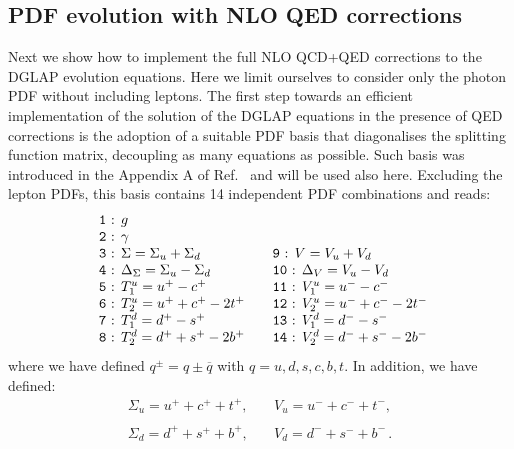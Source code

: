 \subsection{PDF evolution with NLO QED corrections}

Next we show how to implement the full NLO QCD+QED corrections to the
DGLAP evolution equations. Here we limit ourselves to consider only
the photon PDF without including leptons.
%
The first step towards an efficient implementation of the solution of
the DGLAP equations in the presence of QED corrections is the adoption
of a suitable PDF basis that diagonalises the splitting function
matrix, decoupling as many equations as possible.
%
Such basis was introduced in the Appendix A of
Ref.~\cite{Bertone:2015lqa} and will be used also here.
%
Excluding the lepton PDFs, this basis contains 14 independent PDF
combinations and reads:
\begin{equation}\label{eq:EvolBasis}
\begin{array}{ll}
\mbox{\texttt{ 1} : }g & \\
\mbox{\texttt{ 2} : }\gamma & \\
\mbox{\texttt{ 3} : }\displaystyle \Sigma = \Sigma_u + \Sigma_d & \quad
\mbox{\texttt{9} : }\displaystyle V =V_u +  V_d\\
\mbox{\texttt{ 4} : } \displaystyle \Delta_\Sigma = \Sigma_u - \Sigma_d& \quad\displaystyle 
\mbox{\texttt{10} : } \Delta_V = V_u - V_d\\
\mbox{\texttt{ 5} : }T_1^u = u^+ - c^+ &\quad \mbox{\texttt{11} : }V_1^u = u^- - c^- \\
\mbox{\texttt{ 6} : }T_2^u = u^+ + c^+ - 2t^+ &\quad \mbox{\texttt{12} : }V_2^u = u^- + c^- - 2t^-\\
\mbox{\texttt{ 7} : }T_1^d = d^+ - s^+ &\quad \mbox{\texttt{13} : }V_1^d = d^- - s^- \\
\mbox{\texttt{ 8} : }T_2^d = d^+ + s^+ - 2b^+ &\quad \mbox{\texttt{14}
                                               : }V_2^d = d^- + s^- -
                                               2b^-\\
\end{array}
\end{equation}
where we have defined $q^\pm = q\pm\overline{q}$ with
$q = u,d,s,c,b,t$. In addition, we have defined:
\begin{equation}
\begin{array}{ll}
\Sigma_u = u^++c^++t^+, &\quad V_u = u^-+c^-+t^-,\\
\\
\Sigma_d = d^++s^++b^+,&\quad V_d = d^-+s^-+b^-\,.
\end{array}
\end{equation}

